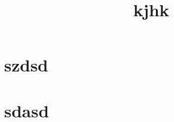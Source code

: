 \documentclass{article}
\begin{document}
\title{kjhk}
\autor{}
\maketitle
\begin{abstract}
\end{abstract}
\section{szdsd}
\section{sdasd}
\end{document}
